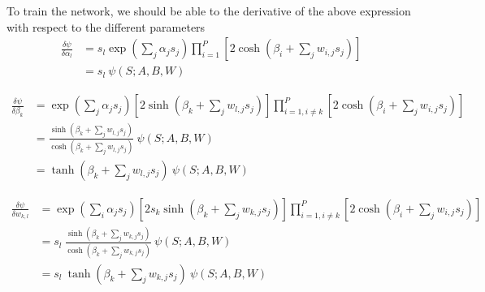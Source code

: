 \documentclass[a4paper]{article}
\begin{document}
To train the network, we should be able to the derivative of the above expression with respect to the different parameters
\begin{align*}
   \frac{\delta \psi}{\delta \alpha_l} &= s_l \exp \left (\sum_j \alpha_j s_j \right) \prod_{i=1}^P \left [ 2 \cosh \left ( \beta_i  + \sum_{j} w_{i,j} s_j \right)\right]\\
                                       &= s_l\ \psi(S; A, B, W)
\end{align*}

\begin{align*}
    \frac{\delta \psi}{\delta \beta_k} &= \exp \left (\sum_j \alpha_j s_j \right) \left [ 2 \sinh \left (  \beta_k + \sum_{j} w_{l,j} s_j \right)\right] \prod_{i=1, i \neq k}^P \left [ 2 \cosh \left ( \beta_i + \sum_{j} w_{i,j} s_j \right)\right]\\                                 
                                       &= \frac{\sinh \left ( \beta_k + \sum_{j} w_{l,j} s_j \right)}{\cosh \left ( \beta_k + \sum_{j} w_{l,j} s_j \right)}\ \psi(S; A, B, W)\\
                                       &= \tanh\left (\beta_k + \sum_{j} w_{l,j} s_j \right)\ \psi(S; A, B, W)
 \end{align*}

 \begin{align*}
    \frac{\delta \psi}{\delta w_{k,l}} &= \exp \left (\sum_i \alpha_j s_j \right) \left [ 2 s_k \sinh \left ( \beta_k + \sum_{j} w_{k,j} s_j \right)\right] \prod_{i=1, i \neq k}^P \left [ 2 \cosh \left ( \beta_i + \sum_{j} w_{i,j} s_j \right)\right]\\                                 
                                       &= s_l \ \frac{\sinh \left ( \beta_k + \sum_{j} w_{k,j} s_j \right)}{\cosh \left ( \beta_k + \sum_{j} w_{k,j} s_j \right)}\ \psi(S; A, B, W)\\
                                       &= s_l\  \tanh\left ( \beta_k + \sum_{j} w_{k,j} s_j \right)\ \psi(S; A, B, W)
 \end{align*}
\end{document}
